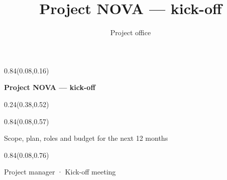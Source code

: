 \documentclass[aspectratio=169]{beamer}
\title{Project NOVA — kick-off}
\author{Project office}
\begin{document}
\begin{frame}[t]

\begin{textblock}{0.84}(0.08,0.16)
{\centering\fontsize{32}{38}\selectfont \textcolor[HTML]{1A1A1A}{\textbf{Project NOVA — kick-off}}\par}
\end{textblock}

\begin{textblock}{0.24}(0.38,0.52)
\end{textblock}

\begin{textblock}{0.84}(0.08,0.57)
{\centering\fontsize{17}{20}\selectfont \textcolor[HTML]{555555}{Scope, plan, roles and budget for the next 12 months}\par}
\end{textblock}

\begin{textblock}{0.84}(0.08,0.76)
{\centering\fontsize{13}{16}\selectfont \textcolor[HTML]{555555}{Project manager  ·  Kick-off meeting}\par}
\end{textblock}
\end{frame}
\end{document}
